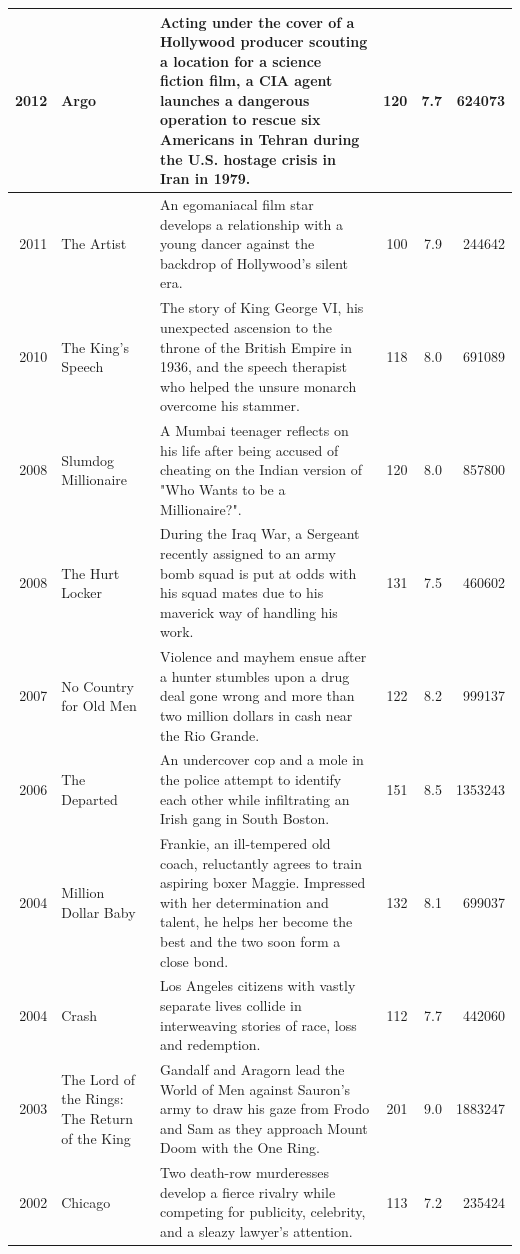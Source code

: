 \documentclass[
]{book}
\begin{document}
\begin{tabular}{r|l|l|r|r|r}
\hline
2012 & Argo & Acting under the cover of a Hollywood producer scouting a location for a science fiction film, a CIA agent launches a dangerous operation to rescue six Americans in Tehran during the U.S. hostage crisis in Iran in 1979. & 120 & 7.7 & 624073\\
\hline
2011 & The Artist & An egomaniacal film star develops a relationship with a young dancer against the backdrop of Hollywood's silent era. & 100 & 7.9 & 244642\\
\hline
2010 & The King's Speech & The story of King George VI, his unexpected ascension to the throne of the British Empire in 1936, and the speech therapist who helped the unsure monarch overcome his stammer. & 118 & 8.0 & 691089\\
\hline
2008 & Slumdog Millionaire & A Mumbai teenager reflects on his life after being accused of cheating on the Indian version of "Who Wants to be a Millionaire?". & 120 & 8.0 & 857800\\
\hline
2008 & The Hurt Locker & During the Iraq War, a Sergeant recently assigned to an army bomb squad is put at odds with his squad mates due to his maverick way of handling his work. & 131 & 7.5 & 460602\\
\hline
2007 & No Country for Old Men & Violence and mayhem ensue after a hunter stumbles upon a drug deal gone wrong and more than two million dollars in cash near the Rio Grande. & 122 & 8.2 & 999137\\
\hline
2006 & The Departed & An undercover cop and a mole in the police attempt to identify each other while infiltrating an Irish gang in South Boston. & 151 & 8.5 & 1353243\\
\hline
2004 & Million Dollar Baby & Frankie, an ill-tempered old coach, reluctantly agrees to train aspiring boxer Maggie. Impressed with her determination and talent, he helps her become the best and the two soon form a close bond. & 132 & 8.1 & 699037\\
\hline
2004 & Crash & Los Angeles citizens with vastly separate lives collide in interweaving stories of race, loss and redemption. & 112 & 7.7 & 442060\\
\hline
2003 & The Lord of the Rings: The Return of the King & Gandalf and Aragorn lead the World of Men against Sauron's army to draw his gaze from Frodo and Sam as they approach Mount Doom with the One Ring. & 201 & 9.0 & 1883247\\
\hline
2002 & Chicago & Two death-row murderesses develop a fierce rivalry while competing for publicity, celebrity, and a sleazy lawyer's attention. & 113 & 7.2 & 235424\\

\end{tabular}
\end{document}

